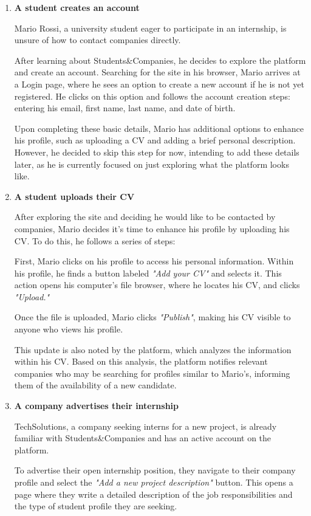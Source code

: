 \begin{enumerate} 
    \item \textbf{A student creates an account}

    Mario Rossi, a university student eager to participate in an internship, is unsure of how to contact companies directly. 
    
    After learning about Students\&Companies, he decides to explore the platform and create an account. Searching for the site in his browser, Mario arrives at a Login page, where he sees an option to create a new account if he is not yet registered. He clicks on this option and follows the account creation steps: entering his email, first name, last name, and date of birth.
    
    Upon completing these basic details, Mario has additional options to enhance his profile, such as uploading a CV and adding a brief personal description. However, he decided to skip this step for now, intending to add these details later, as he is currently focused on just exploring what the platform looks like.

    
    \item \textbf{A student uploads their CV}

    After exploring the site and deciding he would like to be contacted by companies, Mario decides it’s time to enhance his profile by uploading his CV. To do this, he follows a series of steps:

    First, Mario clicks on his profile to access his personal information. Within his profile, he finds a button labeled \textit{"Add your CV"} and selects it. This action opens his computer's file browser, where he locates his CV, and clicks \textit{"Upload."} 
    
    Once the file is uploaded, Mario clicks \textit{"Publish"}, making his CV visible to anyone who views his profile.

    This update is also noted by the platform, which analyzes the information within his CV. Based on this analysis, the platform notifies relevant companies who may be searching for profiles similar to Mario's, informing them of the availability of a new candidate.
    \item \textbf{A company advertises their internship}
    
    TechSolutions, a company seeking interns for a new project, is already familiar with Students\&Companies and has an active account on the platform.
    
    To advertise their open internship position, they navigate to their company profile and select the \textit{"Add a new project description" }button. This opens a page where they write a detailed description of the job responsibilities and the type of student profile they are seeking. 
    

\end{enumerate}

